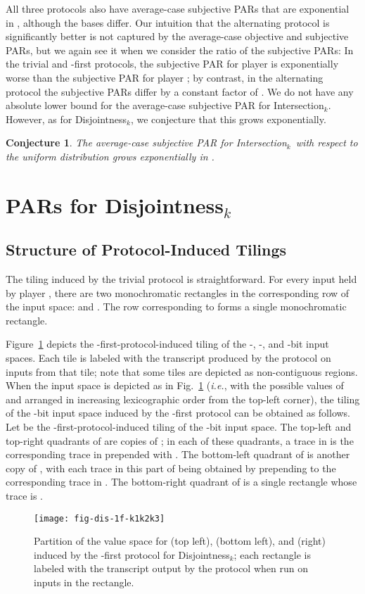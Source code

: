 \documentclass{article}
\theoremstyle{theorem}
\newtheorem{conj}[theorem]{Conjecture}
\theoremstyle{definition}
\theoremstyle{remark}
\newcommand{\ie}{\emph{i.e.}}
\newcommand{\disjoint}{{\sc Dis\-joint\-ness}\ensuremath{_k}}
\newcommand{\intersection}{{\sc In\-ter\-sec\-tion}\ensuremath{_k}}
\begin{document}
All three protocols also have average-case subjective PARs that are exponential in , although the bases differ.  Our intuition that the alternating protocol is significantly better is not captured by the average-case objective and subjective PARs, but we again see it when we consider the ratio of the subjective PARs: In the trivial and -first protocols, the subjective PAR for player  is exponentially worse than the subjective PAR for player ; by contrast, in the alternating protocol the subjective PARs differ by a constant factor of .  We do not have any absolute lower bound for the average-case subjective PAR for \intersection.  However, as for \disjoint, we conjecture that this grows exponentially.
\begin{conj}
The average-case subjective PAR for \intersection\ with respect to the uniform distribution grows exponentially in .
\end{conj}


\section{PARs for \disjoint}\label{sec:disjoint}

\subsection{Structure of Protocol-Induced Tilings}


The tiling induced by the trivial protocol is straightforward.  For every input  held by player , there are two monochromatic rectangles in the corresponding row of the input space:  and .  The row corresponding to  forms a single monochromatic rectangle.

Figure~\ref{fig:dis-1f-k1k2k3} depicts the -first-protocol-induced tiling of the -, -, and -bit input spaces.  Each tile is labeled with the transcript produced by the protocol on inputs from that tile; note that some tiles are depicted as non-contiguous regions.  When the input space is depicted as in Fig.~\ref{fig:dis-1f-k1k2k3} (\ie, with the possible values of  and  arranged in increasing lexicographic order from the top-left corner), the tiling of the -bit input space induced by the -first protocol can be obtained as follows.  Let  be the -first-protocol-induced tiling of the -bit input space.  The top-left and top-right quadrants of  are copies of ; in each of these quadrants, a trace in  is the corresponding trace in  prepended with .  The bottom-left quadrant of  is another copy of , with each trace in this part of  being obtained by prepending  to the corresponding trace in .  The bottom-right quadrant of  is a single rectangle whose trace is .
\begin{figure}[htp]
\begin{center}
\texttt{[image: fig-dis-1f-k1k2k3]}
\caption{Partition of the value space for  (top left),  (bottom left), and  (right) induced by the -first protocol for \disjoint; each rectangle is labeled with the transcript output by the protocol when run on inputs in the rectangle.}\label{fig:dis-1f-k1k2k3}
\end{center}
\end{figure}
\end{document}
